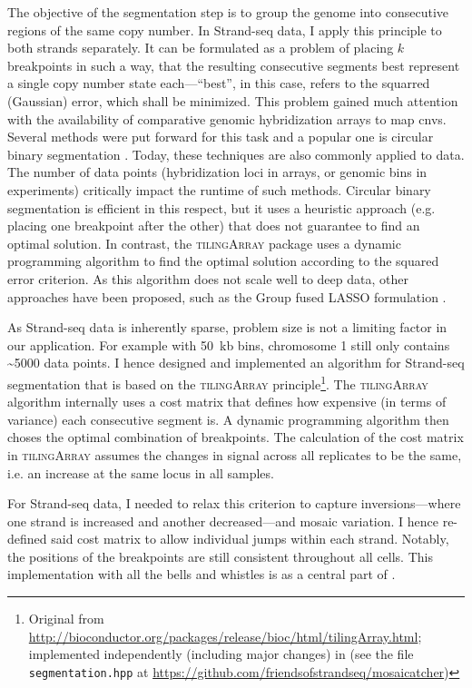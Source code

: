 The objective of the segmentation step is to group the genome into consecutive regions of
the same copy number. In Strand-seq data, I apply this principle to both strands
separately. It can be formulated as a problem of placing $k$
breakpoints in such a way, that the resulting consecutive segments best
represent a single copy number state each---``best'', in this case, refers to
the squarred (Gaussian) error, which shall be minimized. This problem gained much attention with the
availability of comparative genomic hybridization arrays to map \acp{cnv}.
Several methods were put forward for this task and a popular one is circular
binary segmentation \citep{Olshen2004,Venkatraman2007}. Today, these techniques
are also commonly applied to \mps data. The number of data points (hybridization
loci in arrays, or genomic bins in \mps experiments) critically impact the
runtime of such methods. Circular binary segmentation is efficient in this
respect, but it uses a heuristic approach (e.g. placing one breakpoint after the
other) that does not guarantee to find an optimal solution. In contrast, the
\textsc{tilingArray} \citep{Huber2006} package uses a dynamic programming
algorithm to find the optimal solution according to the squared error criterion.
As this algorithm does not scale well to deep \mps data, other approaches have
been proposed, such as the Group fused LASSO formulation \citep{Bleakley2011}.

As Strand-seq data is inherently sparse, problem size is not a limiting factor
in our application. For example with 50~kb bins, chromosome 1 still only
contains \textasciitilde5000 data points. I hence designed and implemented an
algorithm for Strand-seq segmentation that is based on the \textsc{tilingArray}
principle\footnote{Original from \url{http://bioconductor.org/packages/release/bioc/html/tilingArray.html};
    implemented independently (including major changes) in \mc (see the file
    \texttt{segmentation.hpp} at \url{https://github.com/friendsofstrandseq/mosaicatcher})}.
The \textsc{tilingArray} algorithm internally uses a cost matrix that defines
how expensive (in terms of variance) each consecutive segment is. A dynamic
programming algorithm then choses the optimal combination of breakpoints. The
calculation of the cost matrix in \textsc{tilingArray} assumes the changes in
signal across all replicates to be the same, i.e. an increase at the same locus
in all samples.

For Strand-seq data, I needed to relax this criterion to capture
inversions---where one strand is increased and another decreased---and mosaic
variation. I hence re-defined said cost matrix to allow individual jumps within
each strand. Notably, the positions of the breakpoints are still consistent
throughout all cells. This implementation with all the bells and
whistles is as a central part of \mc.






